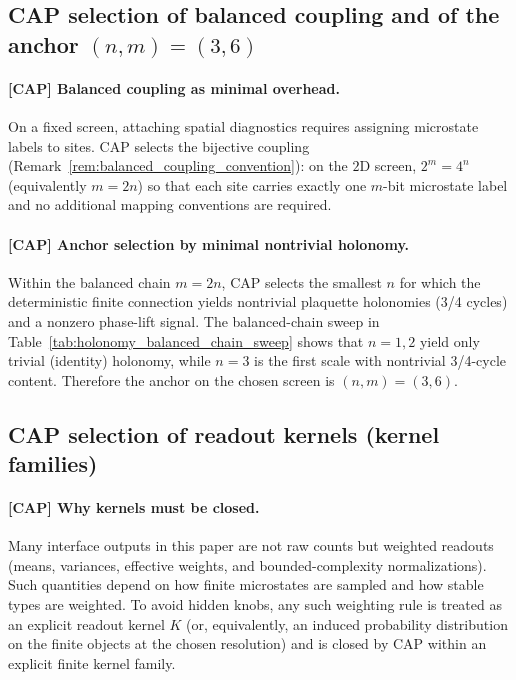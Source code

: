 \subsection{CAP selection of balanced coupling and of the anchor \texorpdfstring{$(n,m)=(3,6)$}{(n,m)=(3,6)}}
\label{subsec:tick_cap_anchor}

\paragraph{[CAP] Balanced coupling as minimal overhead.}
On a fixed screen, attaching spatial diagnostics requires assigning microstate labels to sites.
CAP selects the bijective coupling (Remark~\ref{rem:balanced_coupling_convention}): on the $2$D screen, $2^m=4^n$ (equivalently $m=2n$) so that each site carries exactly one $m$-bit microstate label and no additional mapping conventions are required.

\paragraph{[CAP] Anchor selection by minimal nontrivial holonomy.}
Within the balanced chain $m=2n$, CAP selects the smallest $n$ for which the deterministic finite connection yields nontrivial plaquette holonomies (3/4 cycles) and a nonzero phase-lift signal.
The balanced-chain sweep in Table~\ref{tab:holonomy_balanced_chain_sweep} shows that $n=1,2$ yield only trivial (identity) holonomy, while $n=3$ is the first scale with nontrivial 3/4-cycle content.
Therefore the anchor on the chosen screen is $(n,m)=(3,6)$.

\subsection{CAP selection of readout kernels (kernel families)}
\label{subsec:tick_cap_kernels}

\paragraph{[CAP] Why kernels must be closed.}
\AuditTag Many interface outputs in this paper are not raw counts but weighted readouts (means, variances, effective weights, and bounded-complexity normalizations).
Such quantities depend on how finite microstates are sampled and how stable types are weighted.
To avoid hidden knobs, any such weighting rule is treated as an explicit readout kernel $K$ (or, equivalently, an induced probability distribution on the finite objects at the chosen resolution) and is closed by CAP within an explicit finite kernel family.


